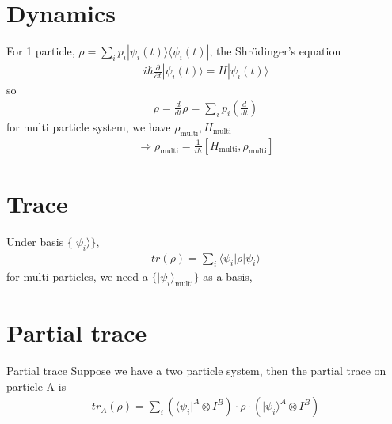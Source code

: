\documentclass[UTF8,12pt]{article} %
\begin{document}
\section{Dynamics}

For 1 particle, $\rho = \sum_{i} p_{i} |\psi_{i}(t)\rangle\langle\psi_{i}(t)|$, the Shr\"{o}dinger's equation
\begin{align}
i\hbar\frac{\partial}{\partial t}|\psi_{i}(t)\rangle = H|\psi_{i}(t)\rangle
\end{align}
so
\begin{align}
\dot{\rho} = \frac{d}{dt} \rho = \sum_{i} p_{i}\left(\frac{d}{dt}\right)
\end{align}
for multi particle system, we have $\rho_{\text{multi}}, H_{\text{multi}}$
\begin{align}
\Rightarrow \dot{\rho}_{\text{multi}} = \frac{1}{i\hbar}[H_{\text{multi}},\rho_{\text{multi}}]
\end{align}

\section{Trace}

Under basis $\{|\psi_{i}\rangle\}$,
\begin{align}
tr(\rho) = \sum_{i}\langle\psi_{i}|\rho|\psi_{i}\rangle
\end{align}
for multi particles, we need a $\{|\psi_{i}\rangle_{\text{multi}}\}$ as a basis,

\section{Partial trace}

\begin{definition}{Partial trace}{}
Suppose we have a two particle system, then the partial trace on particle A is
\begin{align}
tr_{A}(\rho) = \sum_{i} \left(\langle\psi_{i}|^{A} \otimes I^{B}\right) \cdot \rho \cdot \left(|\psi_{i}\rangle^{A} \otimes I^{B}\right)
\end{align}
\end{definition}
\end{document}
